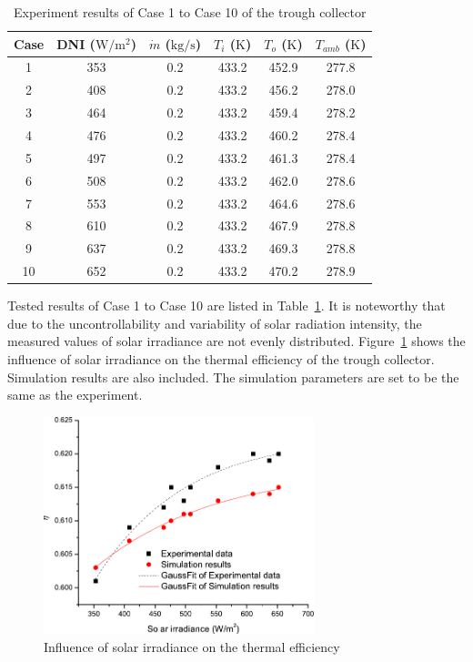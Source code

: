 \begin{table}[htbp]\footnotesize
	\caption{Experiment results of Case 1 to Case 10 of the trough collector}
	\begin{center}
	\begin{tabular}{cccccc}
		\toprule
		Case	& DNI ($\mathrm{W/m^2}$)	&	$\dot{m}$ ($\mathrm{kg/s}$)			&	$T_i$ ($\mathrm{K}$)	&	$T_o$ ($\mathrm{K}$)		&	$T_{amb}$ ($\mathrm{K}$)\\
		\midrule
		1	&	353	&	0.2	&	433.2	&	452.9	&	277.8\\
		2	&	408	&	0.2	&	433.2	&	456.2	&	278.0\\
		3	&	464	&	0.2	&	433.2	&	459.4	&	278.2\\
		4	&	476	&	0.2	&	433.2	&	460.2	&	278.4\\
		5	&	497	&	0.2	&	433.2	&	461.3	&	278.4\\
		6	&	508	&	0.2	&	433.2	&	462.0	&	278.6\\
		7	&	553	&	0.2	&	433.2	&	464.6	&	278.6\\
		8	&	610	&	0.2	&	433.2	&	467.9	&	278.8\\
		9	&	637	&	0.2	&	433.2	&	469.3	&	278.8\\
		10	&	652	&	0.2	&	433.2	&	470.2	&	278.9\\
		\bottomrule
	\end{tabular}
	\end{center}
	\label{tab:ResultOfTrough1}
\end{table}
Tested results of Case 1 to Case 10 are listed in Table~\ref{tab:ResultOfTrough1}. It is noteworthy that due to the uncontrollability and variability of solar radiation intensity, the measured values of solar irradiance are not evenly distributed.
Figure~\ref{fig:I_r-eta-trough} shows the influence of solar irradiance on the thermal efficiency of the trough collector. Simulation results are also included. The simulation parameters are set to be the same as the experiment. 
\begin{figure}[!ht]
\centering
\includegraphics[width=0.7\textwidth]{fig/I_r-eta-trough}
\caption{Influence of solar irradiance on the thermal efficiency}
\label{fig:I_r-eta-trough}
\end{figure}

